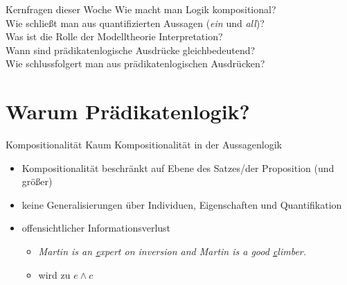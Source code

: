 \begin{frame}
  {Kernfragen dieser Woche}
  \onslide<+->
  \onslide<+->
  \Large
  \centering 
  Wie macht man Logik \alert{kompositional}?\\
  \onslide<+->
  \Halbzeile
  Wie schließt man aus quantifizierten Aussagen (\textit{ein} und \textit{all})?\\
  \onslide<+->
  \Halbzeile
  Was ist die Rolle der \alert{Modelltheorie} Interpretation?\\
  \onslide<+->
  \Halbzeile
  Wann sind prädikatenlogische Ausdrücke \alert{gleichbedeutend}?\\
  \onslide<+->
  \Halbzeile
  Wie \alert{schlussfolgert} man aus prädikatenlogischen Ausdrücken?\\
  \onslide<+->
  \Halbzeile
\end{frame}

\section{Warum Prädikatenlogik?}

\begin{frame}
  {Kompositionalität}
  \onslide<+->
  \onslide<+->
  Kaum Kompositionalität in der Aussagenlogik\\
  \Halbzeile
  \begin{itemize}[<+->]
    \item Kompositionalität beschränkt auf Ebene des \alert{Satzes\slash der Proposition} (und größer)
    \item keine Generalisierungen über \alert{Individuen}, \alert{Eigenschaften} und \alert{Quantifikation}
    \item offensichtlicher Informationsverlust
      \begin{itemize}[<+->]
        \item \textit{Martin is an \underline{e}xpert on inversion and Martin is a good \underline{c}limber.}
        \item wird zu $e\wedge c$
      \end{itemize}
  \end{itemize}
\end{frame}


